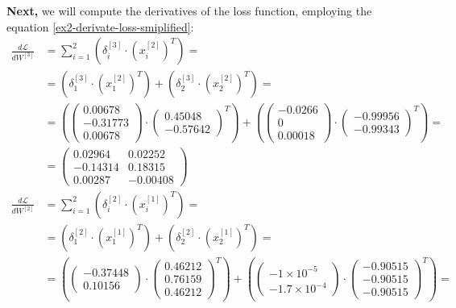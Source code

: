 \documentclass[12pt]{article}
\begin{document}
\begin{enumerate}[leftmargin=\labelsep]
        \textbf{Next,} we will compute the derivatives of the loss function, employing the equation \eqref{ex2-derivate-loss-smiplified}:
        \begingroup
        \allowdisplaybreaks
          \begin{align*}
            \frac{d\mathcal{L}}{dW^{[3]}} &= \sum_{i=1}^{2} \left(\delta^{[3]}_i \cdot \left(x^{[2]}_i\right)^{T}\right) = \\
             &= \left(\delta^{[3]}_1 \cdot \left(x^{[2]}_1\right)^{T}\right) + \left(\delta^{[3]}_2 \cdot \left(x^{[2]}_2\right)^{T}\right) = \\
             &= \left(\begin{pmatrix} 0.00678 \\ -0.31773 \\ 0.00678 \end{pmatrix} \cdot \begin{pmatrix} 0.45048 \\ -0.57642\end{pmatrix}^{T}\right) +
                 \left(\begin{pmatrix} -0.0266 \\ 0 \\ 0.00018 \end{pmatrix} \cdot \begin{pmatrix} -0.99956 \\ -0.99343\end{pmatrix}^{T}\right) = \\
             &= \begin{pmatrix} 0.02964 & 0.02252 \\ -0.14314 & 0.18315 \\ 0.00287 & -0.00408 \end{pmatrix} \\
            \frac{d\mathcal{L}}{dW^{[2]}} &= \sum_{i=1}^{2} \left(\delta^{[2]}_i \cdot \left(x^{[1]}_i\right)^{T}\right) = \\
             &= \left(\delta^{[2]}_1 \cdot \left(x^{[1]}_1\right)^{T}\right) + \left(\delta^{[2]}_2 \cdot \left(x^{[1]}_2\right)^{T}\right) = \\
             &= \left(\begin{pmatrix} -0.37448 \\ 0.10156 \end{pmatrix} \cdot \begin{pmatrix} 0.46212 \\ 0.76159 \\ 0.46212\end{pmatrix}^{T}\right) +
                 \left(\begin{pmatrix} -1 \times 10^{-5} \\ -1.7 \times 10^{-4}  \end{pmatrix} \cdot \begin{pmatrix} -0.90515 \\ -0.90515 \\ -0.90515\end{pmatrix}^{T}\right) = \\

\end{align*}
\end{enumerate}
\end{document}
